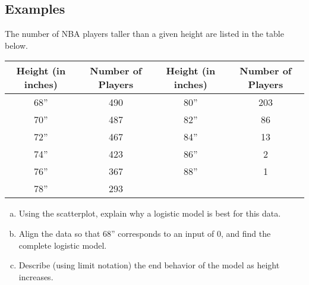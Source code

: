 \documentclass[notes]{subfiles}
\begin{document}
	\subsection*{Examples}
		\begin{ex} The number of NBA players taller than a given height are listed in the table below.
			\begin{center}
				{\renewcommand{\arraystretch}{1.2}
				\begin{tabular}{|c|c||c|c|}\hline
					\textbf{Height} (in inches) & \textbf{Number of Players} & \textbf{Height} (in inches) & \textbf{Number of Players} \\ \hline
					68'' & 490 & 80'' & 203 \\ \hline
					70'' & 487 & 82'' & 86 \\ \hline
					72'' & 467 & 84'' & 13 \\ \hline
					74'' & 423 & 86'' & 2 \\ \hline
					76'' & 367 & 88'' & 1 \\ \hline
					78'' & 293 &  &  \\ \hline
				\end{tabular}
				}
			\end{center}
			\begin{enumerate}[(a)]
				\item Using the scatterplot, explain why a logistic model is best for this data.
				\item Align the data so that 68'' corresponds to an input of 0, and find the complete logistic model.
				\item Describe (using limit notation) the end behavior of the model as height increases.
			\end{enumerate}
		\end{ex}
			\newpage
\end{document}
